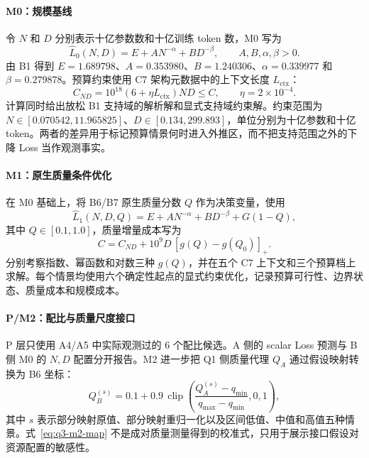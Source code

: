 \paragraph{M0：规模基线}
令 $N$ 和 $D$ 分别表示十亿参数数和十亿训练 token 数，M0 写为
\begin{equation}
 \widehat L_0(N,D)=E+A N^{-\alpha}+B D^{-\beta},
 \qquad A,B,\alpha,\beta>0 .
 \label{eq:q3-m0}
\end{equation}
由 B1 得到 $E=1.689798$、$A=0.353980$、$B=1.240306$、$\alpha=0.339977$ 和 $\beta=0.279878$。预算约束使用 C7 架构元数据中的上下文长度 $L_{\mathrm{ctx}}$：
\begin{equation}
 C_{ND}=10^{18}(6+\eta L_{\mathrm{ctx}})ND\le C,
 \qquad \eta=2\times10^{-4}.
 \label{eq:q3-budget}
\end{equation}
计算同时给出放松 B1 支持域的解析解和显式支持域约束解。约束范围为 $N\in[0.070542,11.965825]$、$D\in[0.134,299.893]$，单位分别为十亿参数和十亿 token。两者的差异用于标记预算情景何时进入外推区，而不把支持范围之外的下降 Loss 当作观测事实。

\paragraph{M1：原生质量条件优化}
在 M0 基础上，将 B6/B7 原生质量分数 $Q$ 作为决策变量，使用
\begin{equation}
 \widehat L_1(N,D,Q)=E+A N^{-\alpha}+B D^{-\beta}+G(1-Q),
 \label{eq:q3-m1}
\end{equation}
其中 $Q\in[0.1,1.0]$，质量增量成本写为
\begin{equation}
 C=C_{ND}+10^9D\,[g(Q)-g(Q_0)]_+ .
 \label{eq:q3-quality-cost}
\end{equation}
分别考察指数、幂函数和对数三种 $g(Q)$，并在五个 C7 上下文和三个预算档上求解。每个情景均使用六个确定性起点的显式约束优化，记录预算可行性、边界状态、质量成本和规模成本。

\paragraph{P/M2：配比与质量尺度接口}
P 层只使用 A4/A5 中实际观测过的 6 个配比候选。A 侧的 scalar Loss 预测与 B 侧 M0 的 $N,D$ 配置分开报告。M2 进一步把 Q1 侧质量代理 $Q_A$ 通过假设映射转换为 B6 坐标：
\begin{equation}
 Q_B^{(s)}=0.1+0.9\,\operatorname{clip}\!\left(
 \frac{Q_A^{(s)}-q_{\min}}{q_{\max}-q_{\min}},0,1\right),
 \label{eq:q3-m2-map}
\end{equation}
其中 $s$ 表示部分映射原值、部分映射重归一化以及区间低值、中值和高值五种情景。式~\eqref{eq:q3-m2-map} 不是成对质量测量得到的校准式，只用于展示接口假设对资源配置的敏感性。

